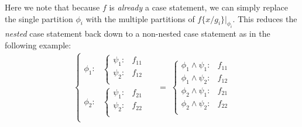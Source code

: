 \documentclass[twoside,11pt]{article}
\begin{document}
 Here we note that because $f$ is \emph{already} a case
statement, we can simply replace the single partition $\phi_i$ with the
multiple partitions of $f\{ x / g_i \}|_{\phi_i}$.%
This reduces the \emph{nested} case statement back down to a non-nested case
statement as in the following example:
\begin{align*}
    \begin{cases}
      \phi_1: & 
        \begin{cases}
          \psi_1: & f_{11} \\ 
          \psi_2: & f_{12}  \\ 
        \end{cases} \\
      \phi_2: & 
        \begin{cases}
          \psi_1: & f_{21} \\ 
          \psi_2: & f_{22}  \\ 
        \end{cases} \\
    \end{cases} & \; = \;
        \begin{cases}
          \phi_1 \land \psi_1: & f_{11} \\ 
          \phi_1 \land \psi_2: & f_{12}  \\ 
          \phi_2 \land \psi_1: & f_{21} \\ 
          \phi_2 \land \psi_2: & f_{22}  \\ 
        \end{cases} 
\end{align*}
\end{document}
